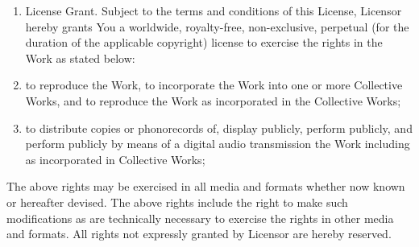 \begin{enumerate}
\item
  License Grant. Subject to the terms and conditions of this License,
  Licensor hereby grants You a worldwide, royalty-free,
  non-exclusive, perpetual (for the duration of the applicable
  copyright) license to exercise the rights in the Work as stated
  below:

\item
  to reproduce the Work, to incorporate the Work into one or more
  Collective Works, and to reproduce the Work as incorporated in the
  Collective Works;

\item
  to distribute copies or phonorecords of, display publicly, perform
  publicly, and perform publicly by means of a digital audio
  transmission the Work including as incorporated in Collective
  Works;

\end{enumerate}
The above rights may be exercised in all media and formats whether
now known or hereafter devised. The above rights include the right
to make such modifications as are technically necessary to exercise
the rights in other media and formats. All rights not expressly
granted by Licensor are hereby reserved.

